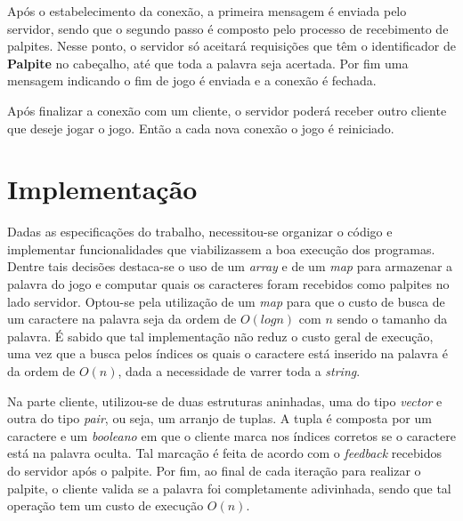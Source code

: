 \documentclass[10pt]{extarticle}
\begin{document}
Após o estabelecimento da conexão, a primeira mensagem é enviada pelo servidor, sendo que o segundo passo é composto pelo processo de recebimento de palpites. Nesse ponto, o servidor só aceitará requisições que têm o identificador de \textbf{Palpite} no cabeçalho, até que toda a palavra seja acertada. Por fim uma mensagem indicando o fim de jogo é enviada e a conexão é fechada.

Após finalizar a conexão com um cliente, o servidor poderá receber outro cliente que deseje jogar o jogo. Então a cada nova conexão o jogo é reiniciado.

\section{Implementação}
Dadas as especificações do trabalho, necessitou-se organizar o código e implementar funcionalidades que viabilizassem a boa execução dos programas. Dentre tais decisões destaca-se o uso de um \textit{array} e de um \textit{map} para armazenar a palavra do jogo e computar quais os caracteres foram recebidos como palpites no lado servidor. Optou-se pela utilização de um \textit{map} para que o custo de busca de um caractere na palavra seja da ordem de $O(log n)$ com $n$ sendo o tamanho da palavra. É sabido que tal implementação não reduz o custo geral de execução, uma vez que a busca pelos índices os quais o caractere está inserido na palavra é da ordem de $O(n)$, dada a necessidade de varrer toda a \textit{string}.

Na parte cliente, utilizou-se de duas estruturas aninhadas, uma do tipo \textit{vector} e outra do tipo \textit{pair}, ou seja, um arranjo de tuplas. A tupla é composta por um caractere e um \textit{booleano} em que o cliente marca nos índices corretos se o caractere está na palavra oculta. Tal marcação é feita de acordo com o \textit{feedback} recebidos do servidor após o palpite. Por fim, ao final de cada iteração para realizar o palpite, o cliente valida se a palavra foi completamente adivinhada, sendo que tal operação tem um custo de execução $O(n)$.
\end{document}
